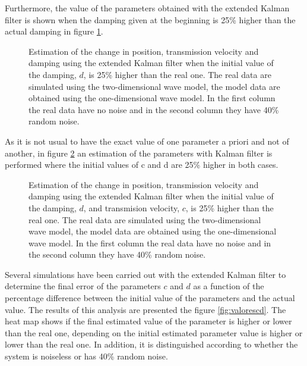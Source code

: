 \documentclass[12pt, a4paper]{article} %
\begin{document}
Furthermore, the value of the parameters obtained with the extended Kalman filter is shown when the damping given at the beginning is 25\% higher than the actual damping in figure \ref{fig:kalman1d}.

\begin{figure}[h!]
    \centering
    
    \caption{Estimation of the change in position, transmission velocity and damping using the extended Kalman filter when the initial value of the damping, $d$, is 25\% higher than the real one. The real data are simulated using the two-dimensional wave model, the model data are obtained using the one-dimensional wave model. In the first column the real data have no noise and in the second column they have 40\% random noise.}
    \label{fig:kalman1d}
\end{figure}

\newpage

As it is not usual to have the exact value of one parameter a priori and not of another, in figure \ref{fig:kalman1dc} an estimation of the parameters with Kalman filter is performed where the initial values of c and d are 25\% higher in both cases.

\newpage

\begin{figure}[h!]
    \centering
    
    \caption{Estimation of the change in position, transmission velocity and damping using the extended Kalman filter when the initial value of the damping, $d$, and transmision velocity, $c$, is 25\% higher than the real one. The real data are simulated using the two-dimensional wave model, the model data are obtained using the one-dimensional wave model. In the first column the real data have no noise and in the second column they have 40\% random noise.}
    \label{fig:kalman1dc}
\end{figure}

Several simulations have been carried out with the extended Kalman filter to determine the final error of the parameters $c$ and $d$ as a function of the percentage difference between the initial value of the parameters and the actual value. The results of this analysis are presented the figure \ref{fig:valorescd}. The heat map shows if the final estimated value of the parameter is higher or lower than the real one, depending on the initial estimated parameter value is higher or lower than the real one. In addition, it is distinguished according to whether the system is noiseless or has 40\% random noise.
\end{document}
